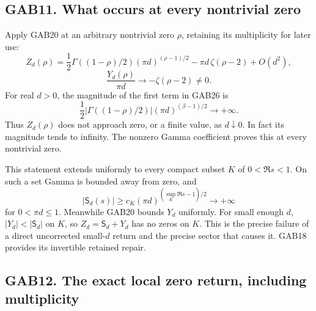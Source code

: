\documentclass[
  10pt,
  a4paper,
]{article}
\begin{document}
\subsection{GAB11. What occurs at every nontrivial
zero}\label{gab11.-what-occurs-at-every-nontrivial-zero}

Apply GAB20 at an arbitrary nontrivial zero \(\rho\), retaining its
multiplicity for later use: \[
 Z_d(\rho)
 =\frac12\Gamma((1-\rho)/2)(\pi d)^{(\rho-1)/2}
       -\pi d\,\zeta(\rho-2)+O(d^2),                   \tag{GAB26}
\] \[
 \frac{Y_d(\rho)}{\pi d}\longrightarrow-\zeta(\rho-2)
          \ne0.                                      \tag{GAB27}
\] For real \(d>0\), the magnitude of the first term in GAB26 is \[
 \frac12|\Gamma((1-\rho)/2)|(\pi d)^{(\beta-1)/2}
       \longrightarrow+\infty.
\] Thus \(Z_d(\rho)\) does not approach zero, or a finite value, as
\(d\downarrow0\). In fact its magnitude tends to infinity. The nonzero
Gamma coefficient proves this at every nontrivial zero.

This statement extends uniformly to every compact subset \(K\) of
\(0<\Re s<1\). On such a set Gamma is bounded away from zero, and \[
 |\mathsf S_d(s)|\ge c_K(\pi d)^{(\sup_K\Re s-1)/2}
           \longrightarrow+\infty
\] for \(0<\pi d\le1\). Meanwhile GAB20 bounds \(Y_d\) uniformly. For
small enough \(d\), \(|Y_d|<|\mathsf S_d|\) on \(K\), so
\(Z_d=\mathsf S_d+Y_d\) has no zeros on \(K\). This is the precise
failure of a direct uncorrected small-\(d\) return and the precise
sector that causes it. GAB18 provides its invertible retained repair.

\subsection{GAB12. The exact local zero return, including
multiplicity}\label{gab12.-the-exact-local-zero-return-including-multiplicity}
\end{document}
